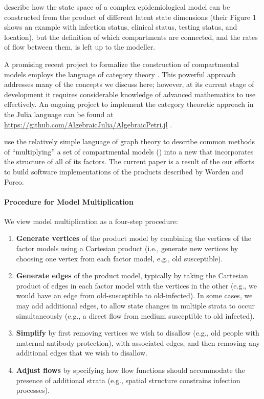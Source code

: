 \cite{friston2020dynamic} describe how the state space of a complex epidemiological model can be constructed from the product of different latent state dimensions (their Figure 1 shows an example with infection status, clinical status, testing status, and location), but the definition of which compartments are connected, and the rates of flow between them, is left up to the modeller.

A promising recent project to formalize the construction of compartmental models employs the language of category theory \citep{fong2018seven, Libkind2022an, libkind2021operadic, baez2023categorical, baez2017compositional}. This powerful approach addresses many of the concepts we discuss here; however, at its current stage of development it requires considerable knowledge of advanced mathematics to use effectively.  An ongoing project to implement the category theoretic approach in the Julia language can be found at \url{https://github.com/AlgebraicJulia/AlgebraicPetri.jl} \citep{algebraicjulia}. 

\cite{worden2017products} use the relatively simple language of graph theory to describe common methods of “multiplying” a set of compartmental models () into a new  that incorporates the structure of all of its factors. The current paper is a result of the our efforts to build software implementations of the products described by Worden and Porco. 

\paragraph{Procedure for Model Multiplication}\label{genproc}

We view model multiplication as a four-step procedure:

\begin{enumerate}
    \item \textbf{Generate vertices} of the product model by combining the vertices of the factor models using a Cartesian product (i.e., generate new vertices by choosing one vertex from each factor model, e.g., old susceptible).
    \item \textbf{Generate edges} of the product model, typically by taking the Cartesian product of edges in each factor model with the vertices in the other (e.g., we would have an edge from old-susceptible to old-infected). In some cases, we may add additional edges, to allow state changes in multiple strata to occur simultaneously (e.g., a direct flow from medium susceptible to old infected).
	\item \textbf{Simplify} by first removing vertices we wish to disallow (e.g., old people with maternal antibody protection), with associated edges, and then removing any additional edges that we wish to disallow.
    \item \textbf{Adjust flows} by specifying how flow functions should accommodate the presence of additional strata (e.g., spatial structure constrains infection processes).
\end{enumerate}

